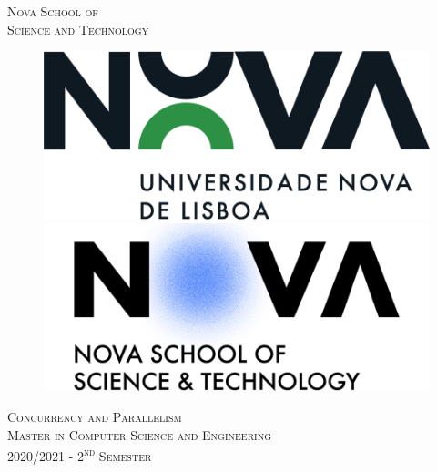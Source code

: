\documentclass[12pt]{article}
\begin{document}
    \begin{titlepage}
    
    \newcommand{\HRule}{\rule{\linewidth}{0.5mm}} %
    
    \center %
     
    
    \textsc{\LARGE{Nova School of\\[0.25cm]Science and Technology}}\\[1cm] %
    \begin{figure}[H]
        \centering
        \begin{minipage}{.5\textwidth}
            \centering
            \includegraphics[width=.8\linewidth]{figures/logos/nova-university-lisbon-logo.png}
        \end{minipage}%
        \begin{minipage}{.5\textwidth}
            \centering
            \vspace{-0.2cm}
            \includegraphics[width=.9\linewidth]{figures/logos/nova-school-science-and-technology-logo.png}
        \end{minipage}
    \end{figure}
    \vspace{0.5cm}
    \textsc{\Large Concurrency and Parallelism}\\[0.5cm] %
    \textsc{Master in Computer Science and Engineering}\\[0.5cm] %
    \textsc{\large 2020/2021 - 2\textsuperscript{nd} Semester}\\[0.5cm] %
    

\end{titlepage}
\end{document}
